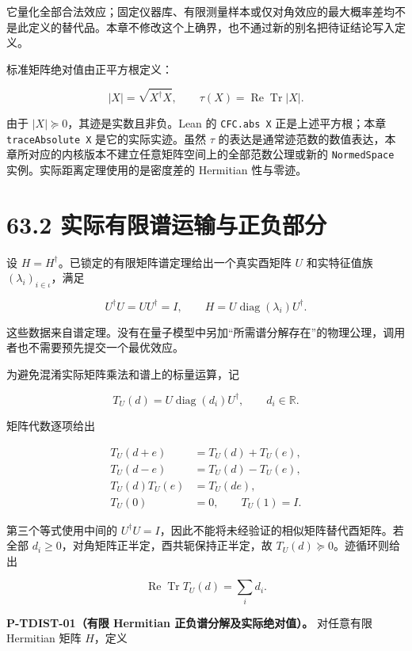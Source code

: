 \documentclass[
  11pt,
  oneside]{book}
\begin{document}
它量化全部合法效应；固定仪器库、有限测量样本或仅对角效应的最大概率差均不是此定义的替代品。本章不修改这个上确界，也不通过新的别名把待证结论写入定义。

标准矩阵绝对值由正平方根定义：

\[
|X|=\sqrt{X^\dagger X},
\qquad
\tau(X)=\operatorname{Re}\operatorname{Tr}|X|.
\]

由于 \(|X|\succeq0\)，其迹是实数且非负。Lean 的 \texttt{CFC.\allowbreak abs\ X}
正是上述平方根；本章 \texttt{trace\allowbreak Absolute\ X} 是它的实际实迹。虽然
\(\tau\)
的表达是通常迹范数的数值表达，本章所对应的内核版本不建立任意矩阵空间上的全部范数公理或新的
\texttt{Normed\allowbreak Space} 实例。实际距离定理使用的是密度差的 Hermitian
性与零迹。

\section{63.2 实际有限谱运输与正负部分}

设 \(H=H^\dagger\)。已锁定的有限矩阵谱定理给出一个真实酉矩阵 \(U\)
和实特征值族 \((\lambda_i)_{i\in\iota}\)，满足

\[
U^\dagger U=UU^\dagger=I,
\qquad
H=U\operatorname{diag}(\lambda_i)U^\dagger.
\]

这些数据来自谱定理。没有在量子模型中另加``所需谱分解存在''的物理公理，调用者也不需要预先提交一个最优效应。

为避免混淆实际矩阵乘法和谱上的标量运算，记

\[
T_U(d)=U\operatorname{diag}(d_i)U^\dagger,
\qquad d_i\in\mathbb R.
\]

矩阵代数逐项给出

\[
\begin{aligned}
T_U(d+e)&=T_U(d)+T_U(e),\\
T_U(d-e)&=T_U(d)-T_U(e),\\
T_U(d)T_U(e)&=T_U(de),\\
T_U(0)&=0,\qquad T_U(1)=I.
\end{aligned}
\]

第三个等式使用中间的
\(U^\dagger U=I\)，因此不能将未经验证的相似矩阵替代酉矩阵。若全部
\(d_i\ge0\)，对角矩阵正半定，酉共轭保持正半定，故
\(T_U(d)\succeq0\)。迹循环则给出

\[
\operatorname{Re}\operatorname{Tr}T_U(d)=\sum_i d_i.
\]

\protect\hypertarget{p-tdist-01}{}{}

\textbf{P-TDIST-01（有限 Hermitian 正负谱分解及实际绝对值）。}
对任意有限 Hermitian 矩阵 \(H\)，定义
\end{document}
